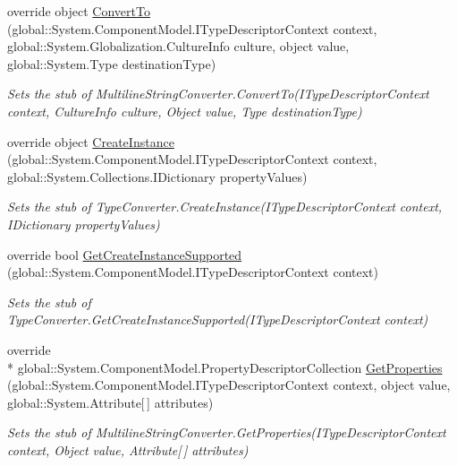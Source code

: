 \begin{DoxyCompactItemize}
override object \hyperlink{class_system_1_1_component_model_1_1_fakes_1_1_stub_multiline_string_converter_a39fb379b49aa50e0d6bcaf35146ffd53}{Convert\-To} (global\-::\-System.\-Component\-Model.\-I\-Type\-Descriptor\-Context context, global\-::\-System.\-Globalization.\-Culture\-Info culture, object value, global\-::\-System.\-Type destination\-Type)
\begin{DoxyCompactList}\small\item\em Sets the stub of Multiline\-String\-Converter.\-Convert\-To(\-I\-Type\-Descriptor\-Context context, Culture\-Info culture, Object value, Type destination\-Type)\end{DoxyCompactList}\item 
override object \hyperlink{class_system_1_1_component_model_1_1_fakes_1_1_stub_multiline_string_converter_aec1ef72404e04cf955d833971620cbbd}{Create\-Instance} (global\-::\-System.\-Component\-Model.\-I\-Type\-Descriptor\-Context context, global\-::\-System.\-Collections.\-I\-Dictionary property\-Values)
\begin{DoxyCompactList}\small\item\em Sets the stub of Type\-Converter.\-Create\-Instance(\-I\-Type\-Descriptor\-Context context, I\-Dictionary property\-Values)\end{DoxyCompactList}\item 
override bool \hyperlink{class_system_1_1_component_model_1_1_fakes_1_1_stub_multiline_string_converter_a2779f646e8234a5a6137aa1c727b0e62}{Get\-Create\-Instance\-Supported} (global\-::\-System.\-Component\-Model.\-I\-Type\-Descriptor\-Context context)
\begin{DoxyCompactList}\small\item\em Sets the stub of Type\-Converter.\-Get\-Create\-Instance\-Supported(\-I\-Type\-Descriptor\-Context context)\end{DoxyCompactList}\item 
override \\*
global\-::\-System.\-Component\-Model.\-Property\-Descriptor\-Collection \hyperlink{class_system_1_1_component_model_1_1_fakes_1_1_stub_multiline_string_converter_ad72c1376df987c9602c7798defad30e6}{Get\-Properties} (global\-::\-System.\-Component\-Model.\-I\-Type\-Descriptor\-Context context, object value, global\-::\-System.\-Attribute\mbox{[}$\,$\mbox{]} attributes)
\begin{DoxyCompactList}\small\item\em Sets the stub of Multiline\-String\-Converter.\-Get\-Properties(\-I\-Type\-Descriptor\-Context context, Object value, Attribute\mbox{[}$\,$\mbox{]} attributes)\end{DoxyCompactList}\item 

\end{DoxyCompactItemize}
